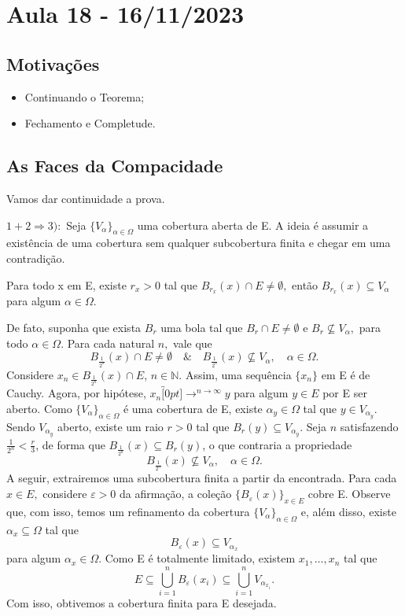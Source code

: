 \documentclass[MetricSpaces/metric_notes.tex]{subfiles}
\begin{document}
\section{Aula 18 - 16/11/2023}
\subsection{Motivações}
\begin{itemize}
	\item Continuando o Teorema;
	\item Fechamento e Completude.
\end{itemize}
\subsection{As Faces da Compacidade}
Vamos dar continuidade a prova.
\begin{proof*}
	\(1 + 2 \Rightarrow 3):\) Seja \(\{V_{\alpha }\}_{\alpha \in \Omega }\) uma cobertura aberta de E. A ideia
	é assumir a existência de uma cobertura sem qualquer subcobertura finita e chegar em uma contradição.

	\begin{claim*}Para todo x em E, existe \(r_{x}> 0\) tal que \(B_{r_{x}}(x)\cap E \neq\emptyset, \) então
		\(B_{r_{x}}(x)\subseteq V_{\alpha }\) para algum \(\alpha \in \Omega \).
	\end{claim*}

	De fato, suponha que exista \(B_{r}\) uma bola tal que \(B_{r}\cap E \neq\emptyset\) e \(B_{r}\not\subseteq V_{\alpha },\) para todo
	\(\alpha \in \Omega \). Para cada natural \(n,\) vale que
	\[
		B_{\frac{1}{2^{n}}}(x)\cap E \neq\emptyset\quad\&\quad B_{\frac{1}{2^{n}}}(x)\not\subseteq V_{\alpha }, \quad\alpha \in \Omega .
	\]
	Considere \(x_{n}\in B_{\frac{1}{2^{n}}}(x)\cap E\), \(n\in \mathbb{N}.\) Assim, uma sequência \(\{x_{n}\}\) em E é
	de Cauchy. Agora, por hipótese, \(x_{n}\overbracket[0pt]{\longrightarrow}^{n\to \infty}y\) para algum \(y\in E\) por
	E ser aberto. Como \(\{V_{\alpha }\}_{\alpha \in \Omega }\) é uma cobertura de E, existe \(\alpha_{y} \in \Omega \) tal que
	\(y\in V_{\alpha_{y}}\). Sendo \(V_{\alpha_{y}}\) aberto, existe um raio \(r > 0\) tal que \(B_{r}(y)\subseteq V_{\alpha _{y}}.\)
	Seja \(n\) satisfazendo \(\frac{1}{2^{n}} < \frac{r}{3}\), de forma que \(B_{\frac{1}{2^{n}}}(x)\subseteq B_{r}(y)\), o que
	contraria a propriedade
	\[
		B_{\frac{1}{2^{n}}}(x)\not\subseteq V_{\alpha }, \quad\alpha \in \Omega .
	\]
	A seguir, extrairemos uma subcobertura finita a partir da encontrada. Para cada \(x\in E, \) considere
	\(\varepsilon > 0\) da afirmação, a coleção \(\{B_{\varepsilon }(x)\}_{x\in E}\) cobre E. Observe que, com isso,
	temos um refinamento da cobertura \(\{V_{\alpha }\}_{\alpha \in \Omega }\) e, além disso, existe \(\alpha_{x}\subseteq \Omega \)
	tal que
	\[
		B_{\varepsilon }(x)\subseteq V_{\alpha_{x}}
	\]
	para algum \(\alpha_{x}\in \Omega \). Como E é totalmente limitado, existem \(x_{1}, \dotsc, x_{n}\) tal que
	\[
		E\subseteq \bigcup_{i=1}^{n}B_{\varepsilon }(x_{i})\subseteq \bigcup_{i=1}^{n}V_{\alpha_{x_{i}}}.
	\]
	Com isso, obtivemos a cobertura finita para E desejada. \qedsymbol
\end{proof*}
\end{document}

